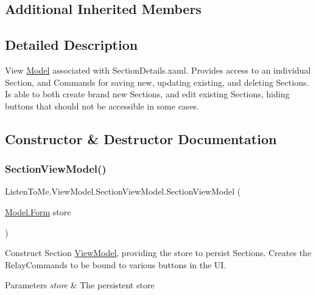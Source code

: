 \subsection*{Additional Inherited Members}


\subsection{Detailed Description}
View \mbox{\hyperlink{namespace_listen_to_me_1_1_model}{Model}} associated with Section\+Details.\+xaml. Provides access to an individual Section, and Commands for saving new, updating existing, and deleting Sections. Is able to both create brand new Sections, and edit existing Sections, hiding buttons that should not be accessible in some cases. 



\subsection{Constructor \& Destructor Documentation}
\mbox{\label{class_listen_to_me_1_1_view_model_1_1_section_view_model_a622922d8160810c017cbe323966da8cd}} 
\subsubsection{\texorpdfstring{Section\+View\+Model()}{SectionViewModel()}}
{\footnotesize\ttfamily Listen\+To\+Me.\+View\+Model.\+Section\+View\+Model.\+Section\+View\+Model (\begin{DoxyParamCaption}\item[{\mbox{\hyperlink{class_listen_to_me_1_1_model_1_1_form}{Model.\+Form}}}]{store }\end{DoxyParamCaption})}



Construct Section \mbox{\hyperlink{namespace_listen_to_me_1_1_view_model}{View\+Model}}, providing the store to persist Sections. Creates the Relay\+Commands to be bound to various buttons in the UI. 


\begin{DoxyParams}{Parameters}
{\em store} & The persistent store\\
\hline
\end{DoxyParams}


